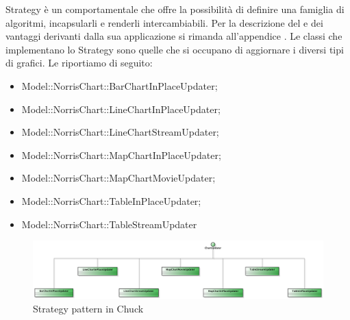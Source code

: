 			Strategy è un  comportamentale che offre la possibilità di definire una famiglia di
algoritmi, incapsularli e renderli intercambiabili. Per la descrizione del  e dei vantaggi derivanti dalla sua applicazione si rimanda all'appendice .
					Le classi che implementano lo Strategy sono quelle che si occupano di aggiornare i diversi tipi di grafici. Le riportiamo di seguito:
					\begin{itemize}
					\item Model::NorrisChart::BarChartInPlaceUpdater;
					\item Model::NorrisChart::LineChartInPlaceUpdater;
					\item Model::NorrisChart::LineChartStreamUpdater;
					\item Model::NorrisChart::MapChartInPlaceUpdater;
					\item Model::NorrisChart::MapChartMovieUpdater;
					\item Model::NorrisChart::TableInPlaceUpdater;
					\item Model::NorrisChart::TableStreamUpdater
				\end{itemize}
				\begin{figure}[H]\centering
	        		\includegraphics[width=\textwidth]{SpecificaTecnica/Pics/DesignPatternNorris/Strategy}
	        		\caption{Strategy pattern in Chuck}
	    		\end{figure}
	    	
